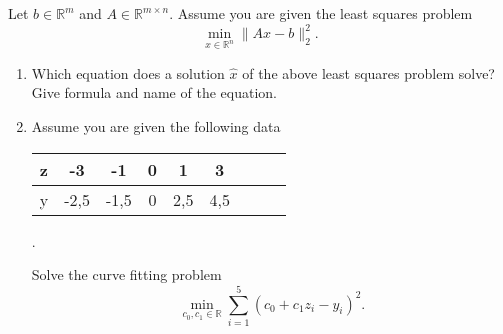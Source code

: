 Let $b \in \mathbb{R}^m$ and $A \in \mathbb{R}^{m\times n}$.
Assume you are given the least squares problem 
$$
\min\limits_{x \in \mathbb{R}^n } \| Ax - b \|_2^2.
$$
\begin{enumerate}
	\item Which equation does a solution $\hat{x}$ of the above least squares problem solve? Give formula and name of the equation.
	\item Assume you are given the following data
	\begin{center}
	\begin{tabular}{|l|c|c|c|c|c|c||c|c|}\hline
	z&-3&-1&0&1&3\\ 
	\hline
	y&-2,5&-1,5&0&2,5&4,5\\
	\hline
\end{tabular}.
	\end{center}
	Solve the curve fitting problem
	$$
	\min\limits_{c_0, c_1 \in \mathbb{R}} \sum_{i=1}^5 (c_0 + c_1z_i - y_i)^2.
	$$
\end{enumerate}

 